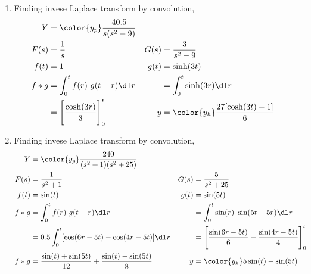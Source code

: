 \begin{enumerate}
    \item Finding invese Laplace transform by convolution,
          \begin{align}
              Y     & = \color{y_p} \frac{40.5}{s(s^2 - 9)}       \\
              F(s)  & = \frac{1}{s}                             &
              G(s)  & = \frac{3}{s^2 - 9}                         \\
              f(t)  & = 1                                       &
              g(t)  & = \sinh(3t)                                 \\
              f * g & = \int_{0}^{t} f(r)\ g(t-r) \dl r         &
                    & = \int_{0}^{t} \sinh(3r) \dl r              \\
                    & = \Bigg[ \frac{\cosh(3r)}{3} \Bigg]_0^t   &
              y     & = \color{y_h} \frac{27[\cosh(3t) - 1]}{6}
          \end{align}

    \item Finding invese Laplace transform by convolution,
          \begin{align}
              Y              & = \color{y_p} \frac{240}{(s^2 + 1)(s^2 + 25)}       \\
              F(s)           & = \frac{1}{s^2 + 1}                               &
              G(s)           & = \frac{5}{s^2 + 25}                                \\
              f(t)           & = \sin(t)                                         &
              g(t)           & = \sin(5t)                                          \\
              f * g          & = \int_{0}^{t} f(r)\ g(t-r) \dl r                 &
                             & = \int_{0}^{t} \sin(r)\ \sin(5t - 5r) \dl r         \\
                             & = 0.5\int_{0}^{t} [\cos(6r - 5t) - \cos(4r - 5t)]
              \dl r          &
                             & = \Bigg[ \frac{\sin(6r - 5t)}{6}
                  - \frac{\sin(4r - 5t)}
              {4} \Bigg]_0^t                                                       \\
              f * g          & = \frac{\sin(t) + \sin(5t)}{12} + \frac{\sin(t)
              - \sin(5t)}{8} &
              y              & = \color{y_h} 5\sin(t) - \sin(5t)
          \end{align}


\end{enumerate}
